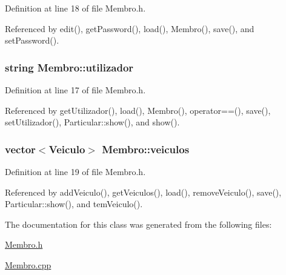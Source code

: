 Definition at line 18 of file Membro.\+h.



Referenced by edit(), get\+Password(), load(), Membro(), save(), and set\+Password().

\hypertarget{class_membro_a42cc733ff94ec8d1bbfdacc62dfbb0e7}{
\subsubsection[{utilizador}]{\setlength{\rightskip}{0pt plus 5cm}string Membro\+::utilizador\hspace{0.3cm}{\ttfamily [protected]}}}\label{class_membro_a42cc733ff94ec8d1bbfdacc62dfbb0e7}


Definition at line 17 of file Membro.\+h.



Referenced by get\+Utilizador(), load(), Membro(), operator==(), save(), set\+Utilizador(), Particular\+::show(), and show().

\hypertarget{class_membro_a7485fc8a9f992a05662866f19b22f74a}{
\subsubsection[{veiculos}]{\setlength{\rightskip}{0pt plus 5cm}vector$<${\bf Veiculo}$>$ Membro\+::veiculos\hspace{0.3cm}{\ttfamily [protected]}}}\label{class_membro_a7485fc8a9f992a05662866f19b22f74a}


Definition at line 19 of file Membro.\+h.



Referenced by add\+Veiculo(), get\+Veiculos(), load(), remove\+Veiculo(), save(), Particular\+::show(), and tem\+Veiculo().



The documentation for this class was generated from the following files\+:\begin{DoxyCompactItemize}
\item 
\hyperlink{_membro_8h}{Membro.\+h}\item 
\hyperlink{_membro_8cpp}{Membro.\+cpp}\end{DoxyCompactItemize}
